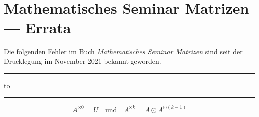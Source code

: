\documentclass{article}
\begin{document}
\section*{Mathematisches Seminar Matrizen --- Errata}

Die folgenden Fehler im Buch {\em Mathematisches Seminar Matrizen}
sind seit der Drucklegung im November 2021 bekannt geworden.

\vspace*{1cm}

{\parindent0pt

\rule[0mm]{\textwidth}{0.5pt}
\hbox to
\rule[2mm]{\textwidth}{0.5pt}


}

\[
A^{\odot0}=U
\quad\text{und}\quad
A^{\odot k}=A\odot A^{\odot(k-1)}
\]
\end{document}

